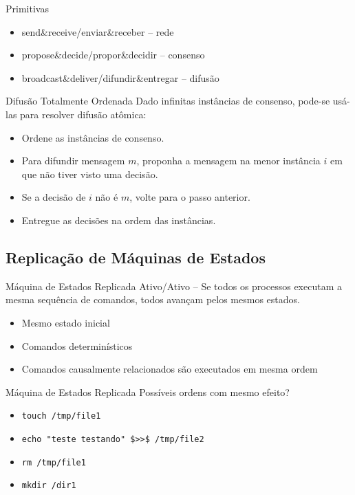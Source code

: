 \begin{frame}{Primitivas}
\begin{itemize}
	\item send\&receive/enviar\&receber -- rede
	\item propose\&decide/propor\&decidir -- consenso
	\item broadcast\&deliver/difundir\&entregar -- difusão
\end{itemize}
\end{frame}


\begin{frame}{Difusão Totalmente Ordenada}
Dado infinitas instâncias de consenso, pode-se usá-las para resolver difusão atômica:
\begin{itemize}
\item Ordene as instâncias de consenso.
\item Para difundir mensagem $m$, proponha a mensagem na menor instância $i$ em que não tiver visto uma decisão.
\item Se a decisão de $i$ não é $m$, volte para o passo anterior.
\item Entregue as decisões na ordem das instâncias.
\end{itemize}
\end{frame}


\subsection{Replicação de Máquinas de Estados}

\begin{frame}{Máquina de Estados Replicada}
Ativo/Ativo -- Se todos os processos executam a mesma sequência de comandos, todos avançam pelos mesmos estados.

\begin{itemize}
	\item Mesmo estado inicial
	\item Comandos determinísticos
	\item Comandos causalmente relacionados são executados em mesma ordem
\end{itemize}
\end{frame}

\begin{frame}{Máquina de Estados Replicada}
Possíveis ordens com mesmo efeito?
\begin{itemize}
\item \lstinline|touch /tmp/file1|
\item \lstinline|echo "teste testando" $>>$ /tmp/file2|
\item \lstinline|rm /tmp/file1|
\item \lstinline|mkdir /dir1|
\end{itemize}
\end{frame}


